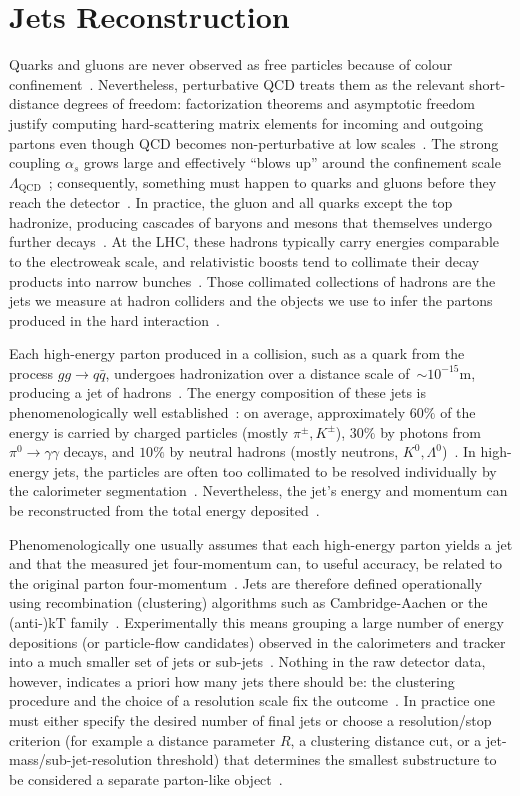 \section{Jets Reconstruction}\label{sec:jets}

Quarks and gluons are never observed as free particles because of colour confinement~\cite{dummy}. Nevertheless, perturbative QCD treats them as the relevant short-distance degrees of freedom: factorization theorems and asymptotic freedom justify computing hard-scattering matrix elements for incoming and outgoing partons even though QCD becomes non-perturbative at low scales~\cite{dummy}. The strong coupling $\alpha_s$ grows large and effectively ``blows up'' around the confinement scale $\Lambda_{\mathrm{QCD}}$~\cite{dummy}; consequently, something must happen to quarks and gluons before they reach the detector~\cite{dummy}. In practice, the gluon and all quarks except the top hadronize, producing cascades of baryons and mesons that themselves undergo further decays~\cite{dummy}. At the LHC, these hadrons typically carry energies comparable to the electroweak scale, and relativistic boosts tend to collimate their decay products into narrow bunches~\cite{dummy}. Those collimated collections of hadrons are the jets we measure at hadron colliders and the objects we use to infer the partons produced in the hard interaction~\cite{dummy}.

Each high-energy parton produced in a collision, such as a quark from the process $gg \rightarrow q\bar{q}$, undergoes hadronization over a distance scale of~$\sim10^{-15}\mathrm{m}$, producing a jet of hadrons~\cite{dummy}. The energy composition of these jets is phenomenologically well established~\cite{dummy}: on average, approximately $60\%$ of the energy is carried by charged particles (mostly $\pi^{\pm}, K^{\pm}$), $30\%$ by photons from $\pi^0 \rightarrow \gamma\gamma$ decays, and $10\%$ by neutral hadrons (mostly neutrons, $K^0, \Lambda^0$)~\cite{dummy}. In high-energy jets, the particles are often too collimated to be resolved individually by the calorimeter segmentation~\cite{dummy}. Nevertheless, the jet's energy and momentum can be reconstructed from the total energy deposited~\cite{dummy}.

Phenomenologically one usually assumes that each high-energy parton yields a jet and that the measured jet four-momentum can, to useful accuracy, be related to the original parton four-momentum~\cite{dummy}. Jets are therefore defined operationally using recombination (clustering) algorithms such as Cambridge-Aachen or the (anti-)kT family~\cite{dummy}. Experimentally this means grouping a large number of energy depositions (or particle-flow candidates) observed in the calorimeters and tracker into a much smaller set of jets or sub-jets~\cite{dummy}. Nothing in the raw detector data, however, indicates a priori how many jets there should be: the clustering procedure and the choice of a resolution scale fix the outcome~\cite{dummy}. In practice one must either specify the desired number of final jets or choose a resolution/stop criterion (for example a distance parameter $R$, a clustering distance cut, or a jet-mass/sub-jet-resolution threshold) that determines the smallest substructure to be considered a separate parton-like object~\cite{dummy}.

